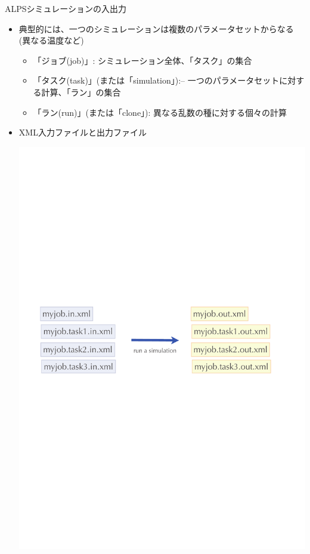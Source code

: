\begin{frame}{ALPSシミュレーションの入出力}
  \begin{itemize}
  \item 典型的には、一つのシミュレーションは複数のパラメータセットからなる(異なる温度など)
    \begin{itemize}
    \item 「ジョブ(job)」: シミュレーション全体、「タスク」の集合
    \item 「タスク(task)」(または「simulation」):– 一つのパラメータセットに対する計算、「ラン」の集合
    \item 「ラン(run)」(または「clone」): 異なる乱数の種に対する個々の計算
    \end{itemize}
  \item XML入力ファイルと出力ファイル
  \begin{center}
    \includegraphics[width=.55\textwidth]{simulation1.pdf}
  \end{center}
  \end{itemize}
\end{frame}

\subsection*{\redm\whitem\greenb}

